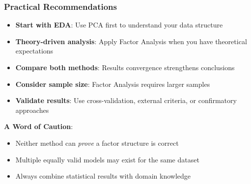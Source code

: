 \documentclass[aspectratio=169]{beamer}
\begin{document}
\begin{frame}[fragile]
    \frametitle{Practical Recommendations}
    \begin{itemize}
        \item \textbf{Start with EDA}: Use PCA first to understand your data structure \pause
        \item \textbf{Theory-driven analysis}: Apply Factor Analysis when you have theoretical expectations \pause
        \item \textbf{Compare both methods}: Results convergence strengthens conclusions \pause
        \item \textbf{Consider sample size}: Factor Analysis requires larger samples \pause
        \item \textbf{Validate results}: Use cross-validation, external criteria, or confirmatory approaches
    \end{itemize}
    \vspace{12pt}
    \textbf{A Word of Caution}:
    \begin{itemize}
        \item Neither method can \textit{prove} a factor structure is correct \pause
        \item Multiple equally valid models may exist for the same dataset \pause
        \item Always combine statistical results with domain knowledge
    \end{itemize}
\end{frame}
\end{document}
